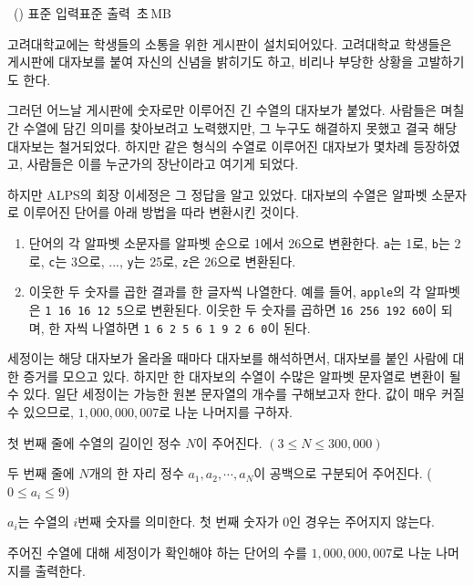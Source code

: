 \begin{problem}{\kcpcprobposter\ (\kcpcprobpostershort)}
    {표준 입력}{표준 출력}
    {\kcpcprobpostertime\,초}{\kcpcprobpostermemory\,MB}{}
    
    고려대학교에는 학생들의 소통을 위한 게시판이 설치되어있다. 고려대학교 학생들은 게시판에 대자보를 붙여 자신의 신념을 밝히기도 하고, 비리나 부당한 상황을 고발하기도 한다. 
    
    그러던 어느날 게시판에 숫자로만 이루어진 긴 수열의 대자보가 붙었다. 사람들은 며칠간 수열에 담긴 의미를 찾아보려고 노력했지만, 그 누구도 해결하지 못했고 결국 해당 대자보는 철거되었다. 하지만 같은 형식의 수열로 이루어진 대자보가 몇차례 등장하였고, 사람들은 이를 누군가의 장난이라고 여기게 되었다.
    
    하지만 ALPS의 회장 이세정은 그 정답을 알고 있었다. 대자보의 수열은 알파벳 소문자로 이루어진 단어를 아래 방법을 따라 변환시킨 것이다.
    
    \begin{enumerate}
        \item 단어의 각 알파벳 소문자를 알파벳 순으로 1에서 26으로 변환한다. \texttt{a}는 1로, \texttt{b}는 2로, \texttt{c}는 3으로, ..., \texttt{y}는 25로, \texttt{z}은 26으로 변환된다.
        \item 이웃한 두 숫자를 곱한 결과를 한 글자씩 나열한다. 예를 들어, \texttt{apple}의 각 알파벳은 \texttt{1 16 16 12 5}으로 변환된다. 이웃한 두 숫자를 곱하면 \texttt{16 256 192 60}이 되며, 한 자씩 나열하면 \texttt{1 6 2 5 6 1 9 2 6 0}이 된다.
    \end{enumerate}
    
   
    
    세정이는 해당 대자보가 올라올 때마다 대자보를 해석하면서, 대자보를 붙인 사람에 대한 증거를 모으고 있다. 하지만 한 대자보의 수열이 수많은 알파벳 문자열로 변환이 될 수 있다. 일단 세정이는 가능한 원본 문자열의 개수를 구해보고자 한다. 값이 매우 커질 수 있으므로, $ 1,000,000,007 $로 나눈 나머지를 구하자.
    
    \InputFile
    첫 번째 줄에 수열의 길이인 정수 $N$이 주어진다. $ (3 \leq N \leq 300,000)$
    
    두 번째 줄에 $N$개의 한 자리 정수 $a_1, a_2, \cdots, a_N$이 공백으로 구분되어 주어진다. ($0 \leq a_i \leq 9$)
    
    $a_i$는 수열의 $i$번째 숫자를 의미한다. 첫 번째 숫자가 0인 경우는 주어지지 않는다.
    
    \OutputFile
    주어진 수열에 대해 세정이가 확인해야 하는 단어의 수를 $ 1,000,000,007 $로 나눈 나머지를 출력한다.
    
    \Examples
    \begin{example}
    \end{example}
\end{problem}

